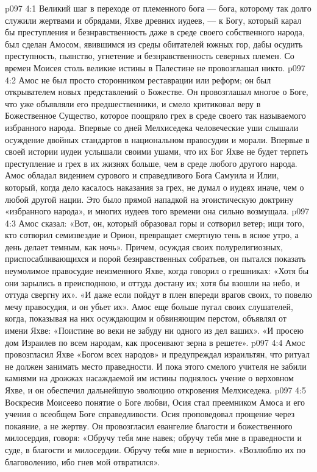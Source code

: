 \vs p097 4:1 Великий шаг в переходе от племенного бога --- бога, которому так долго служили жертвами и обрядами, Яхве древних иудеев, --- к Богу, который карал бы преступления и безнравственность даже в среде своего собственного народа, был сделан Амосом, явившимся из среды обитателей южных гор, дабы осудить преступность, пьянство, угнетение и безнравственность северных племен. Со времен Моисея столь великие истины в Палестине не провозглашал никто.
\vs p097 4:2 Амос не был просто сторонником реставрации или реформ; он был открывателем новых представлений о Божестве. Он провозглашал многое о Боге, что уже объявляли его предшественники, и смело критиковал веру в Божественное Существо, которое поощряло грех в среде своего так называемого избранного народа. Впервые со дней Мелхиседека человеческие уши слышали осуждение двойных стандартов в национальном правосудии и морали. Впервые в своей истории иудеи услышали своими ушами, что их Бог Яхве не будет терпеть преступление и грех в их жизнях больше, чем в среде любого другого народа. Амос обладал видением сурового и справедливого Бога Самуила и Илии, который, когда дело касалось наказания за грех, не думал о иудеях иначе, чем о любой другой нации. Это было прямой нападкой на эгоистическую доктрину «избранного народа», и многих иудеев того времени она сильно возмущала.
\vs p097 4:3 Амос сказал: «Вот, он, который образовал горы и сотворил ветер; ищи того, кто сотворил семизвездие и Орион, превращает смертную тень в ясное утро, а день делает темным, как ночь». Причем, осуждая своих полурелигиозных, приспосабливающихся и порой безнравственных собратьев, он пытался показать неумолимое правосудие неизменного Яхве, когда говорил о грешниках: «Хотя бы они зарылись в преисподнюю, и оттуда достану их; хотя бы взошли на небо, и оттуда свергну их». «И даже если пойдут в плен впереди врагов своих, то повелю мечу правосудия, и он убьет их». Амос еще больше пугал своих слушателей, когда, показывая на них осуждающим и обвиняющим перстом, объявлял от имени Яхве: «Поистине во веки не забуду ни одного из дел ваших». «И просею дом Израилев по всем народам, как просеивают зерна в решете».
\vs p097 4:4 Амос провозгласил Яхве «Богом всех народов» и предупреждал израильтян, что ритуал не должен занимать место праведности. И пока этого смелого учителя не забили камнями на дрожжах насаждаемой им истины поднялось учение о верховном Яхве, и он обеспечил дальнейшую эволюцию откровения Мелхиседека.
\vs p097 4:5 \pc Воскресив Моисеево понятие о Боге любви, Осия стал преемником Амоса и его учения о всеобщем Боге справедливости. Осия проповедовал прощение через покаяние, а не жертву. Он провозгласил евангелие благости и божественного милосердия, говоря: «Обручу тебя мне навек; обручу тебя мне в праведности и суде, в благости и милосердии. Обручу тебя мне в верности». «Возлюблю их по благоволению, ибо гнев мой отвратился».
